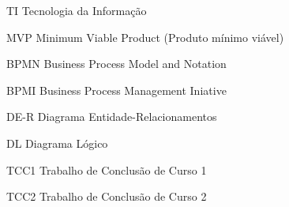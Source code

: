 \begin{siglas}
  \item[TI] Tecnologia da Informação
  \item[MVP] Minimum Viable Product (Produto mínimo viável)
  \item[BPMN] Business Process Model and Notation
  \item[BPMI] Business Process Management Iniative
  \item[DE-R] Diagrama Entidade-Relacionamentos
  \item[DL] Diagrama Lógico
  \item[TCC1] Trabalho de Conclusão de Curso 1
  \item[TCC2] Trabalho de Conclusão de Curso 2
\end{siglas}